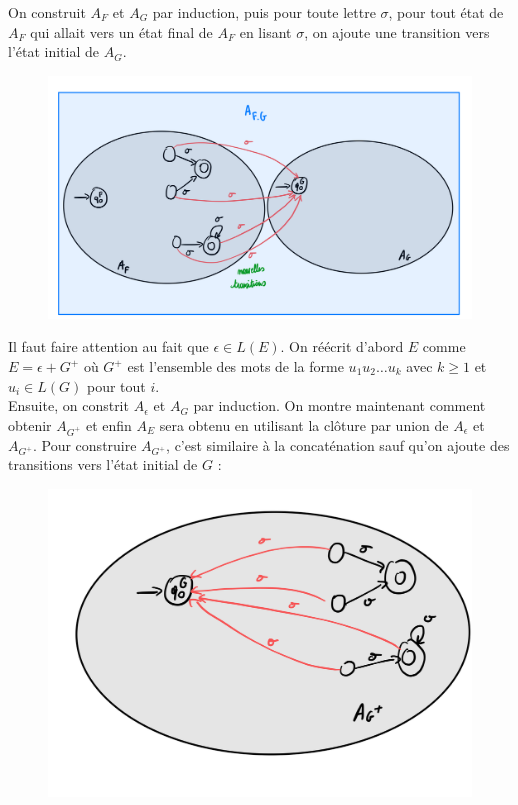 On construit $A_F$ et $A_G$ par induction, puis pour toute lettre $\sigma$, pour tout état de $A_F$ qui allait vers un état
final de $A_F$ en lisant $\sigma$, on ajoute une transition vers l'état initial de $A_G$. 
\begin{figure}[H]
    \centering
    \includegraphics[scale = 0.2]{pictures/AFG.jpeg}
\end{figure}


Il faut faire attention au fait que $\epsilon\in L(E)$. On réécrit d'abord $E$ comme $E = \epsilon +G^+$ où $G^+$ est 
l'ensemble des mots de la forme $u_1u_2\dots u_k$ avec $k\geq 1$ et $u_i\in L(G)$ pour tout $i$.\\
Ensuite, on constrit $A_\epsilon$ et $A_G$ par induction. On montre maintenant comment obtenir $A_{G^+}$ et enfin $A_E$
sera obtenu en utilisant la clôture par union de $A_\epsilon$ et $A_{G^+}$. Pour construire $A_{G^+}$, c'est similaire à
la concaténation sauf qu'on ajoute des transitions vers l'état initial de $G$ :
\begin{figure}[H]
    \centering
    \includegraphics[scale=0.2]{pictures/AG+.jpeg}
\end{figure}


